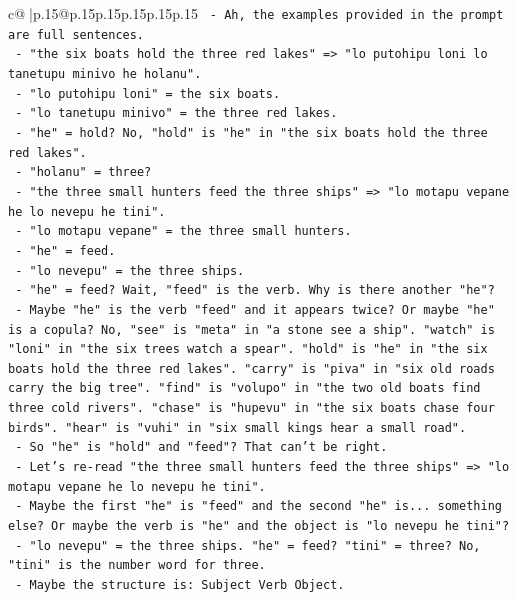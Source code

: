 \documentclass{article}
\begin{document}
{\begin{supertabular}{c@{$\;$}|p{.15\linewidth}@{}p{.15\linewidth}p{.15\linewidth}p{.15\linewidth}p{.15\linewidth}p{.15\linewidth}}
{{{\texttt{          {-} Ah, the examples provided in the prompt are full sentences.} \\
\texttt{            {-} "the six boats hold the three red lakes" => "lo putohipu loni lo tanetupu minivo he holanu".} \\
\texttt{              {-} "lo putohipu loni" = the six boats.} \\
\texttt{              {-} "lo tanetupu minivo" = the three red lakes.} \\
\texttt{              {-} "he" = hold? No, "hold" is "he" in "the six boats hold the three red lakes".} \\
\texttt{              {-} "holanu" = three?} \\
\texttt{            {-} "the three small hunters feed the three ships" => "lo motapu vepane he lo nevepu he tini".} \\
\texttt{              {-} "lo motapu vepane" = the three small hunters.} \\
\texttt{              {-} "he" = feed.} \\
\texttt{              {-} "lo nevepu" = the three ships.} \\
\texttt{              {-} "he" = feed? Wait, "feed" is the verb. Why is there another "he"?} \\
\texttt{              {-} Maybe "he" is the verb "feed" and it appears twice? Or maybe "he" is a copula? No, "see" is "meta" in "a stone see a ship". "watch" is "loni" in "the six trees watch a spear". "hold" is "he" in "the six boats hold the three red lakes". "carry" is "piva" in "six old roads carry the big tree". "find" is "volupo" in "the two old boats find three cold rivers". "chase" is "hupevu" in "the six boats chase four birds". "hear" is "vuhi" in "six small kings hear a small road".} \\
\texttt{              {-} So "he" is "hold" and "feed"? That can't be right.} \\
\texttt{              {-} Let's re{-}read "the three small hunters feed the three ships" => "lo motapu vepane he lo nevepu he tini".} \\
\texttt{                {-} Maybe the first "he" is "feed" and the second "he" is... something else? Or maybe the verb is "he" and the object is "lo nevepu he tini"?} \\
\texttt{                {-} "lo nevepu" = the three ships. "he" = feed? "tini" = three? No, "tini" is the number word for three.} \\
\texttt{                {-} Maybe the structure is: Subject Verb Object.} \\
}}}
\end{supertabular}}
\end{document}

